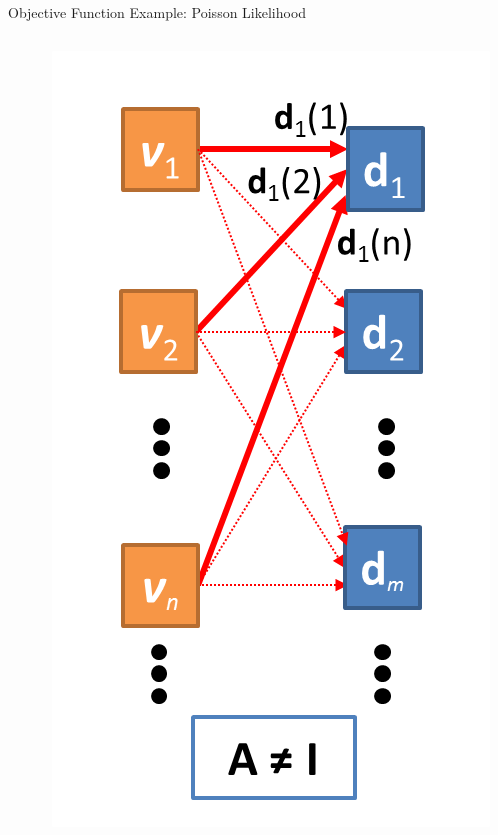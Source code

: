 \begin{frame}[c]{Objective Function Example: Poisson Likelihood}
\begin{columns}[c,onlytextwidth]
\begin{column}[c]{0.6\textwidth}
        \end{column}\begin{column}[c]{0.4\textwidth}
            \begin{centering}
                \includegraphics[height=0.75\textheight]{images/mleC}\\
            \end{centering}
        \end{column}
    \end{columns}
\end{frame}

